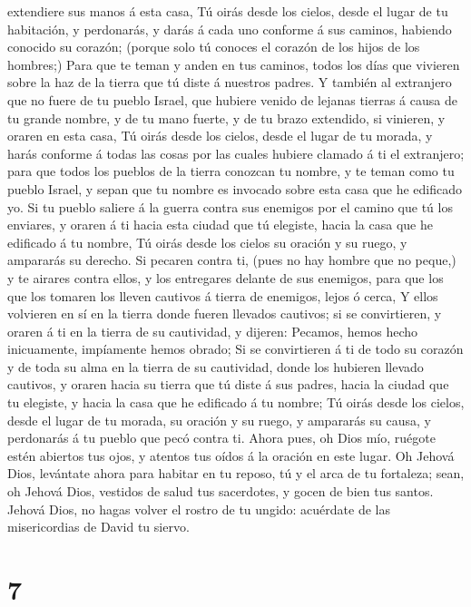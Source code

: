 extendiere sus manos á esta casa,  Tú oirás desde los
cielos, desde el lugar de tu habitación, y perdonarás, y darás á cada
uno conforme á sus caminos, habiendo conocido su corazón; (porque solo
tú conoces el corazón de los hijos de los hombres;)  Para
que te teman y anden en tus caminos, todos los días que vivieren sobre
la haz de la tierra que tú diste á nuestros padres.  Y
también al extranjero que no fuere de tu pueblo Israel, que hubiere
venido de lejanas tierras á causa de tu grande nombre, y de tu mano
fuerte, y de tu brazo extendido, si vinieren, y oraren en esta casa,
 Tú oirás desde los cielos, desde el lugar de tu morada,
y harás conforme á todas las cosas por las cuales hubiere clamado á ti
el extranjero; para que todos los pueblos de la tierra conozcan tu
nombre, y te teman como tu pueblo Israel, y sepan que tu nombre es
invocado sobre esta casa que he edificado yo.  Si tu
pueblo saliere á la guerra contra sus enemigos por el camino que tú los
enviares, y oraren á ti hacia esta ciudad que tú elegiste, hacia la casa
que he edificado á tu nombre,  Tú oirás desde los cielos
su oración y su ruego, y ampararás su derecho.  Si
pecaren contra ti, (pues no hay hombre que no peque,) y te airares
contra ellos, y los entregares delante de sus enemigos, para que los que
los tomaren los lleven cautivos á tierra de enemigos, lejos ó cerca,
 Y ellos volvieren en sí en la tierra donde fueren
llevados cautivos; si se convirtieren, y oraren á ti en la tierra de su
cautividad, y dijeren: Pecamos, hemos hecho inicuamente, impíamente
hemos obrado;  Si se convirtieren á ti de todo su corazón
y de toda su alma en la tierra de su cautividad, donde los hubieren
llevado cautivos, y oraren hacia su tierra que tú diste á sus padres,
hacia la ciudad que tu elegiste, y hacia la casa que he edificado á tu
nombre;  Tú oirás desde los cielos, desde el lugar de tu
morada, su oración y su ruego, y ampararás su causa, y perdonarás á tu
pueblo que pecó contra ti.  Ahora pues, oh Dios mío,
ruégote estén abiertos tus ojos, y atentos tus oídos á la oración en
este lugar.  Oh Jehová Dios, levántate ahora para habitar
en tu reposo, tú y el arca de tu fortaleza; sean, oh Jehová Dios,
vestidos de salud tus sacerdotes, y gocen de bien tus santos.
 Jehová Dios, no hagas volver el rostro de tu ungido:
acuérdate de las misericordias de David tu siervo.

\hypertarget{section-6}{%
\section{7}\label{section-6}}


